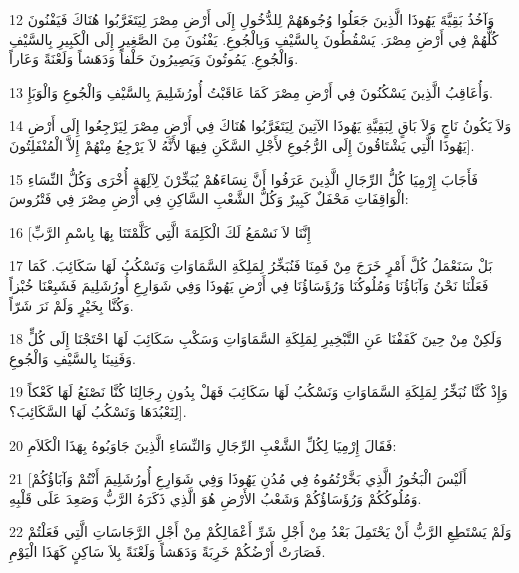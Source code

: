 \par 12 وَآخُذُ بَقِيَّةَ يَهُوذَا الَّذِينَ جَعَلُوا وُجُوهَهُمْ لِلدُّخُولِ إِلَى أَرْضِ مِصْرَ لِيَتَغَرَّبُوا هُنَاكَ فَيَفْنُونَ كُلُّهُمْ فِي أَرْضِ مِصْرَ. يَسْقُطُونَ بِالسَّيْفِ وَبِالْجُوعِ. يَفْنُونَ مِنَ الصَّغِيرِ إِلَى الْكَبِيرِ بِالسَّيْفِ وَالْجُوعِ. يَمُوتُونَ وَيَصِيرُونَ حَلْفاً وَدَهَشاً وَلَعْنَةً وَعَاراً.
\par 13 وَأُعَاقِبُ الَّذِينَ يَسْكُنُونَ فِي أَرْضِ مِصْرَ كَمَا عَاقَبْتُ أُورُشَلِيمَ بِالسَّيْفِ وَالْجُوعِ وَالْوَبَإِ.
\par 14 وَلاَ يَكُونُ نَاجٍ وَلاَ بَاقٍ لِبَقِيَّةِ يَهُوذَا الآتِينَ لِيَتَغَرَّبُوا هُنَاكَ فِي أَرْضِ مِصْرَ لِيَرْجِعُوا إِلَى أَرْضِ يَهُوذَا الَّتِي يَشْتَاقُونَ إِلَى الرُّجُوعِ لأَجْلِ السَّكَنِ فِيهَا لأَنَّهُ لاَ يَرْجِعُ مِنْهُمْ إِلاَّ الْمُنْفَلِتُونَ].
\par 15 فَأَجَابَ إِرْمِيَا كُلُّ الرِّجَالِ الَّذِينَ عَرَفُوا أَنَّ نِسَاءَهُمْ يُبَخِّرْنَ لِآلِهَةٍ أُخْرَى وَكُلُّ النِّسَاءِ الْوَاقِفَاتِ مَحْفَلٌ كَبِيرٌ وَكُلُّ الشَّعْبِ السَّاكِنِ فِي أَرْضِ مِصْرَ فِي فَتْرُوسَ:
\par 16 [إِنَّنَا لاَ نَسْمَعُ لَكَ الْكَلِمَةَ الَّتِي كَلَّمْتَنَا بِهَا بِاسْمِ الرَّبِّ
\par 17 بَلْ سَنَعْمَلُ كُلَّ أَمْرٍ خَرَجَ مِنْ فَمِنَا فَنُبَخِّرُ لِمَلِكَةِ السَّمَاوَاتِ وَنَسْكُبُ لَهَا سَكَائِبَ. كَمَا فَعَلْنَا نَحْنُ وَآبَاؤُنَا وَمُلُوكُنَا وَرُؤَسَاؤُنَا فِي أَرْضِ يَهُوذَا وَفِي شَوَارِعِ أُورُشَلِيمَ فَشَبِعْنَا خُبْزاً وَكُنَّا بِخَيْرٍ وَلَمْ نَرَ شَرّاً.
\par 18 وَلَكِنْ مِنْ حِينَ كَفَفْنَا عَنِ التَّبْخِيرِ لِمَلِكَةِ السَّمَاوَاتِ وَسَكْبِ سَكَائِبَ لَهَا احْتَجْنَا إِلَى كُلٍّ وَفَنِينَا بِالسَّيْفِ وَالْجُوعِ.
\par 19 وَإِذْ كُنَّا نُبَخِّرُ لِمَلِكَةِ السَّمَاوَاتِ وَنَسْكُبُ لَهَا سَكَائِبَ فَهَلْ بِدُونِ رِجَالِنَا كُنَّا نَصْنَعُ لَهَا كَعْكاً لِنَعْبُدَهَا وَنَسْكُبُ لَهَا السَّكَائِبَ؟].
\par 20 فَقَالَ إِرْمِيَا لِكُلِّ الشَّعْبِ الرِّجَالِ وَالنِّسَاءِ الَّذِينَ جَاوَبُوهُ بِهَذَا الْكَلاَمِ:
\par 21 [أَلَيْسَ الْبَخُورُ الَّذِي بَخَّرْتُمُوهُ فِي مُدُنِ يَهُوذَا وَفِي شَوَارِعِ أُورُشَلِيمَ أَنْتُمْ وَآبَاؤُكُمْ وَمُلُوكُكُمْ وَرُؤَسَاؤُكُمْ وَشَعْبُ الأَرْضِ هُوَ الَّذِي ذَكَرَهُ الرَّبُّ وَصَعِدَ عَلَى قَلْبِهِ.
\par 22 وَلَمْ يَسْتَطِعِ الرَّبُّ أَنْ يَحْتَمِلَ بَعْدُ مِنْ أَجْلِ شَرِّ أَعْمَالِكُمْ مِنْ أَجْلِ الرَّجَاسَاتِ الَّتِي فَعَلْتُمْ فَصَارَتْ أَرْضُكُمْ خَرِبَةً وَدَهَشاً وَلَعْنَةً بِلاَ سَاكِنٍ كَهَذَا الْيَوْمِ.
